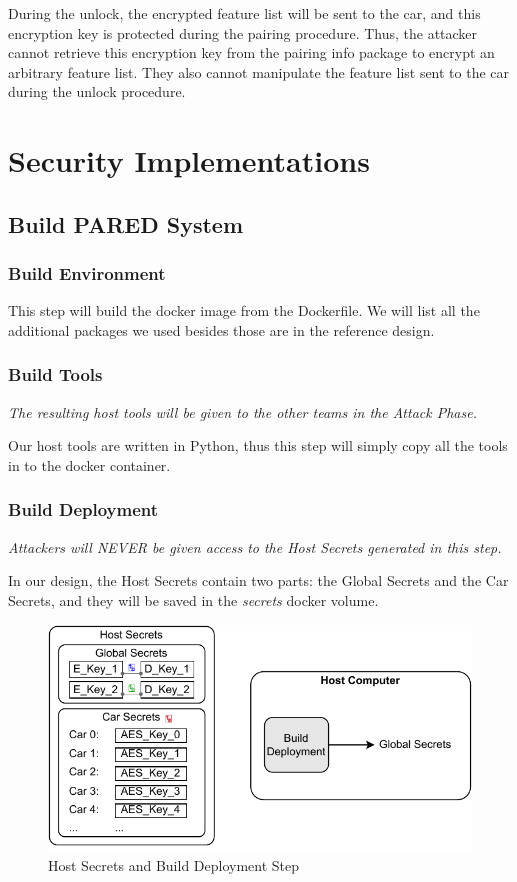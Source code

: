 \documentclass[11pt,oneside,onecolumn,letterpaper]{article}
\begin{document}
During the unlock, the encrypted feature list will be sent to the car, and this encryption key is protected during the pairing procedure.
Thus, the attacker cannot retrieve this encryption key from the pairing info package to encrypt an arbitrary feature list.
They also cannot manipulate the feature list sent to the car during the unlock procedure.


\section{Security Implementations}



\subsection{Build PARED System}

\subsubsection{Build Environment}

This step will build the docker image from the Dockerfile. We will list all the additional packages we used besides those are in the reference design.

\subsubsection{Build Tools}

\textit{The resulting host tools will be given to the other teams in the Attack Phase.}

Our host tools are written in Python, thus this step will simply copy all the tools in to the docker container.

\subsubsection{Build Deployment}

\textit{Attackers will NEVER be given access to the Host Secrets generated in this step.}

In our design, the Host Secrets contain two parts: the Global Secrets and the Car Secrets, and they will be saved in the \textit{secrets} docker volume.

\begin{figure}[!htbp]
	\begin{centering}
		\includegraphics[width = .6\textwidth]{pic/build_depl.pdf}
		\caption{Host Secrets and Build Deployment Step}
		\label{fig:build_depl}
	\end{centering}
\end{figure}
\end{document}
